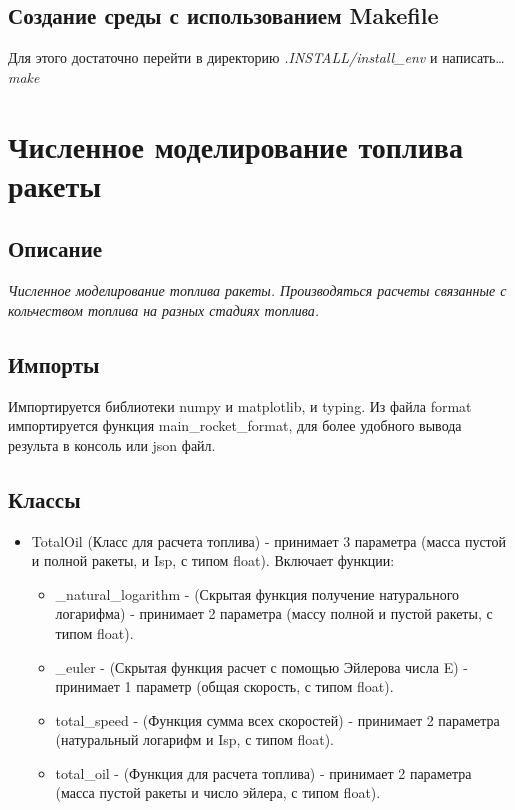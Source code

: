 \documentclass[a4paper, 12pt]{report}
\begin{document}
\section{Создание среды с использованием Makefile}
\textrm{
    Для этого достаточно перейти в директорию {\slshape .INSTALL/install\_env} и написать\ldots {\slshape make}
}
\clearpage
\chapter{Численное моделирование топлива ракеты}
\section{Описание}
\textit{Численное моделирование топлива ракеты. Производяться расчеты связанные с кольчеством топлива на разных стадиях топлива.}\\
\section{Импорты}
\textrm{Импортируется библиотеки numpy и matplotlib, и typing. Из файла format импортируется функция main\_rocket\_format, для более удобного вывода результа в консоль или json файл.}

\section{Классы}
\begin{itemize}
    \item TotalOil (Класс для расчета топлива) - принимает 3 параметра (масса пустой и полной ракеты, и Isp, с типом float). Включает функции:
    \begin{itemize}
        \item \_natural\_logarithm - (Скрытая функция получение натурального логарифма) - принимает 2 параметра (массу полной и пустой ракеты, с типом float).
        \item \_euler - (Скрытая функция расчет с помощью Эйлерова числа E) - принимает 1 параметр (общая скорость, с типом float).
        \item total\_speed - (Функция сумма всех скоростей) - принимает 2 параметра (натуральный логарифм и Isp, с типом float).
        \item total\_oil - (Функция для расчета топлива) - принимает 2 параметра (масса пустой ракеты и число эйлера, с типом float).
    \end{itemize}
\end{itemize}
\clearpage
\end{document}
